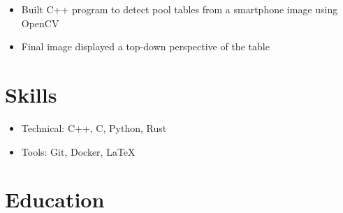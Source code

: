 \documentclass{Custom_CV}
\begin{document}
\begin{itemize}[rightmargin=\dimexpr\linewidth-15cm-\leftmargin\relax,noitemsep]
    \item Built C++ program to detect pool tables from a smartphone image using OpenCV
    \item Final image displayed a top-down perspective of the table
\end{itemize}

\section{Skills}

\begin{itemize}[noitemsep]
\item Technical: C++, C, Python, Rust
\item Tools: Git, Docker, \LaTeX
\end{itemize}

\section{Education}

\end{document}
